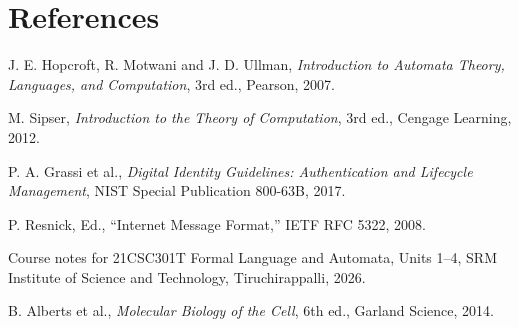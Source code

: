 \documentclass[12pt,a4paper]{article}
\begin{document}
\section*{References}

\begin{enumerate}[label={[\arabic*]},leftmargin=2.2em,itemsep=3pt]
\item J. E. Hopcroft, R. Motwani and J. D. Ullman, \textit{Introduction to Automata Theory, Languages, and Computation}, 3rd ed., Pearson, 2007.
\item M. Sipser, \textit{Introduction to the Theory of Computation}, 3rd ed., Cengage Learning, 2012.
\item P. A. Grassi et al., \textit{Digital Identity Guidelines: Authentication and Lifecycle Management}, NIST Special Publication 800-63B, 2017.
\item P. Resnick, Ed., ``Internet Message Format,'' IETF RFC 5322, 2008.
\item Course notes for 21CSC301T Formal Language and Automata, Units 1--4, SRM Institute of Science and Technology, Tiruchirappalli, 2026.
\item B. Alberts et al., \textit{Molecular Biology of the Cell}, 6th ed., Garland Science, 2014.
\end{enumerate}
\end{document}
